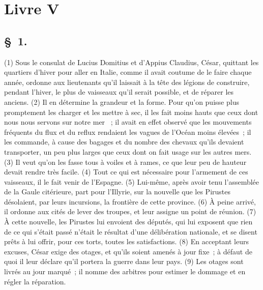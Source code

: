 \documentclass[french,twoside]{book} %
\begin{document}
\section[{Livre V}]{Livre V}\renewcommand{\leftmark}{Livre V}

\subsection[{§ 1.}]{ \textsc{§ 1.} }
\noindent (1) Sous le consulat de Lucius Domitius et d’Appius Claudius, César, quittant les quartiers d’hiver pour aller en Italie, comme il avait coutume de le faire chaque année, ordonne aux lieutenants qu’il laissait à la tête des légions de construire, pendant l’hiver, le plus de vaisseaux qu’il serait possible, et de réparer les anciens. (2) Il en détermine la grandeur et la forme. Pour qu’on puisse plus promptement les charger et les mettre à sec, il les fait moins hauts que ceux dont nous nous servons sur notre mer  ; il avait en effet observé que les mouvements fréquents du flux et du reflux rendaient les vagues de l’Océan moins élevées ; il les commande, à cause des bagages et du nombre des chevaux qu’ils devaient transporter, un peu plus larges que ceux dont on fait usage sur les autres mers. (3) Il veut qu’on les fasse tous à voiles et à rames, ce que leur peu de hauteur devait rendre très facile. (4) Tout ce qui est nécessaire pour l’armement de ces vaisseaux, il le fait venir de l’Espagne. (5) Lui-même, après avoir tenu l’assemblée de la Gaule citérieure, part pour l’Illyrie, sur la nouvelle que les Pirustes désolaient, par leurs incursions, la frontière de cette province. (6) À peine arrivé, il ordonne aux cités de lever des troupes, et leur assigne un point de réunion. (7) À cette nouvelle, les Pirustes lui envoient des députés, qui lui exposent que rien de ce qui s’était passé n’était le résultat d’une délibération nationale, et se disent prêts à lui offrir, pour ces torts, toutes les satisfactions. (8) En acceptant leurs excuses, César exige des otages, et qu’ils soient amenés à jour fixe ; à défaut de quoi il leur déclare qu’il portera la guerre dans leur pays. (9) Les otages sont livrés au jour marqué ; il nomme des arbitres pour estimer le dommage et en régler la réparation.
\end{document}
